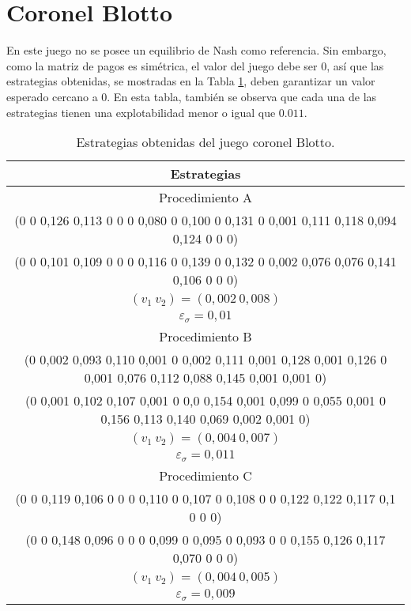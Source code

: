 \section*{Coronel Blotto}

En este juego no se posee un equilibrio de Nash como referencia. Sin embargo, como la matriz de pagos es simétrica, el valor del juego debe ser $0$, así que las estrategias obtenidas, se mostradas en la Tabla \ref{tab:estrategias-coronel-blotto}, deben garantizar un valor esperado cercano a $0$. En esta tabla, también se observa que cada una de las estrategias tienen una explotabilidad menor o igual que $0.011$.

\begin{table}[h]
    \centering
    \caption{Estrategias obtenidas del juego coronel Blotto.}
    \label{tab:estrategias-coronel-blotto}
    \scriptsize
    \begin{tabular}{c}
    \toprule
        Estrategias \\
        \midrule
        Procedimiento A \\ \midrule
         (0 0 0,126 0,113 0 0 0 0,080 0 0,100 0 0,131 0 0,001 0,111 0,118 0,094 0,124 0 0 0) \\
         (0 0 0,101 0,109 0 0 0 0,116 0 0,139 0 0,132 0 0,002 0,076 0,076 0,141 0,106 0 0 0) \\
         $(v_1\ v_2) = (0,002\ 0,008)$ \\
         $\varepsilon_{\sigma} = 0,01$ \\
        \midrule
        Procedimiento B \\ \midrule
         (0 0,002 0,093 0,110 0,001 0 0,002 0,111 0,001 0,128 0,001 0,126 0 0,001 0,076 0,112 0,088 0,145 0,001 0,001 0) \\
         (0 0,001 0,102 0,107 0,001 0 0,0 0,154 0,001 0,099 0 0,055 0,001 0 0,156 0,113 0,140 0,069 0,002 0,001 0) \\
         $(v_1\ v_2) = (0,004\ 0,007)$ \\
         $\varepsilon_{\sigma} = 0,011$ \\
        \midrule
        Procedimiento C \\ \midrule
         (0 0 0,119 0,106 0 0 0 0,110 0 0,107 0 0,108 0 0 0,122 0,122 0,117 0,1 0 0 0) \\
         (0 0 0,148 0,096 0 0 0 0,099 0 0,095 0 0,093 0 0 0,155 0,126 0,117 0,070 0 0 0) \\
         $(v_1\ v_2) = (0,004\ 0,005)$ \\
         $\varepsilon_{\sigma} = 0,009$ \\
        \bottomrule
    \end{tabular}
\end{table}

